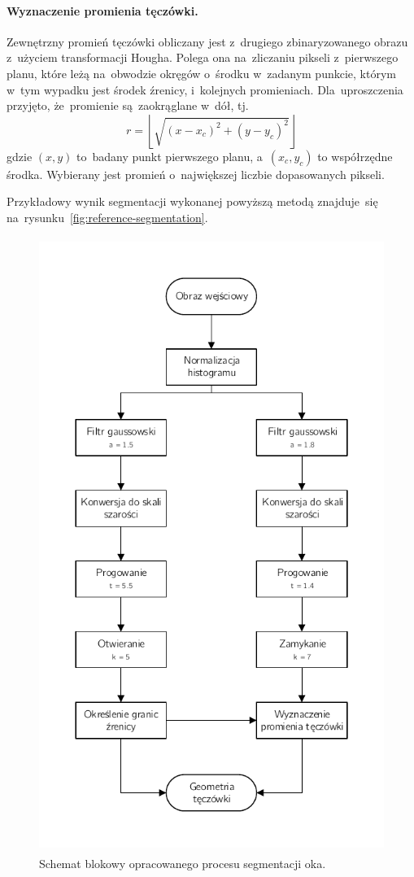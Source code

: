 \documentclass[11pt,a4paper]{article}
\begin{document}
\paragraph{Wyznaczenie promienia tęczówki.}
Zewnętrzny promień tęczówki obliczany jest z~drugiego zbinaryzowanego obrazu z~użyciem transformacji Hougha.
Polega ona na~zliczaniu pikseli z~pierwszego planu, które leżą na~obwodzie okręgów o~środku w~zadanym punkcie, którym w~tym wypadku jest środek źrenicy, i~kolejnych promieniach.
Dla~uproszczenia przyjęto, że~promienie są~zaokrąglane w~dół, tj.
$$ r = \left\lfloor \sqrt{(x - x_c)^2 + (y - y_c)^2} \right\rfloor $$
gdzie $(x, y)$ to~badany punkt pierwszego planu, a~$(x_c, y_c)$ to współrzędne środka.
Wybierany jest promień o~największej liczbie dopasowanych pikseli.

Przykładowy wynik segmentacji wykonanej powyższą metodą znajduje~się na~rysunku~\ref{fig:reference-segmentation}.

\begin{figure}
    \centering
    \includegraphics[height=20cm]{res/img/diagram.pdf}
    \caption{Schemat blokowy opracowanego procesu segmentacji oka.}
    \label{fig:block-diagram}
\end{figure}
\end{document}
